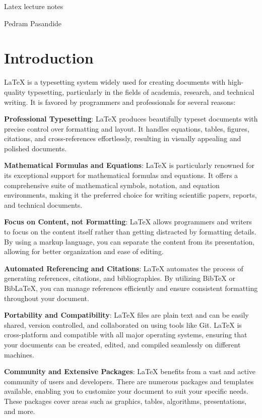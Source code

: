 \documentclass[12pt]{article}
\begin{document}
	
	
	Latex lecture notes
	
	Pedram Pasandide
	
	\clearpage
	\tableofcontents
	\clearpage
	
	
	\section{Introduction}
	
	LaTeX is a typesetting system widely used for creating documents with high-quality typesetting, particularly in the fields of academia, research, and technical writing. It is favored by programmers and professionals for several reasons:
	
    \textbf{Professional Typesetting}: LaTeX produces beautifully typeset documents with precise control over formatting and layout. It handles equations, tables, figures, citations, and cross-references effortlessly, resulting in visually appealing and polished documents.
	
	\textbf{Mathematical Formulas and Equations}: LaTeX is particularly renowned for its exceptional support for mathematical formulas and equations. It offers a comprehensive suite of mathematical symbols, notation, and equation environments, making it the preferred choice for writing scientific papers, reports, and technical documents.
	
	\textbf{Focus on Content, not Formatting}: LaTeX allows programmers and writers to focus on the content itself rather than getting distracted by formatting details. By using a markup language, you can separate the content from its presentation, allowing for better organization and ease of editing.
	
	\textbf{Automated Referencing and Citations}: LaTeX automates the process of generating references, citations, and bibliographies. By utilizing BibTeX or BibLaTeX, you can manage references efficiently and ensure consistent formatting throughout your document.
	
	\textbf{Portability and Compatibility}: LaTeX files are plain text and can be easily shared, version controlled, and collaborated on using tools like Git. LaTeX is cross-platform and compatible with all major operating systems, ensuring that your documents can be created, edited, and compiled seamlessly on different machines.
	
	\textbf{Community and Extensive Packages}: LaTeX benefits from a vast and active community of users and developers. There are numerous packages and templates available, enabling you to customize your document to suit your specific needs. These packages cover areas such as graphics, tables, algorithms, presentations, and more.
	
\end{document}
